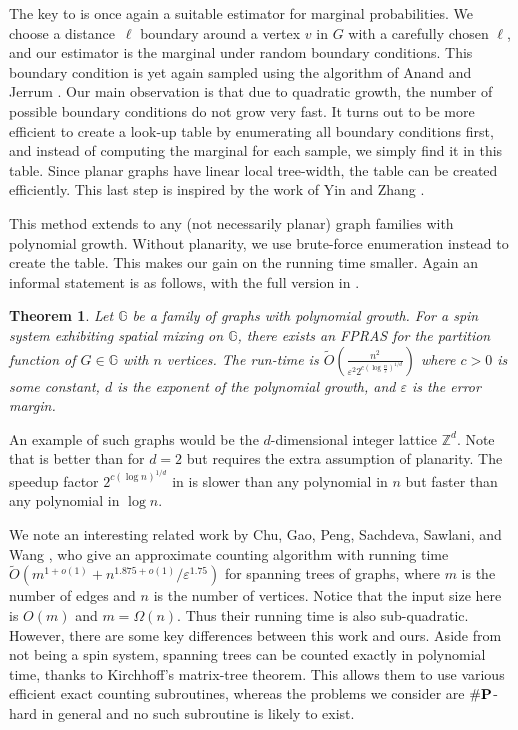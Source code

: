 \documentclass[10pt,a4paper]{article}
\newtheorem{theorem}{Theorem}[section]
\def\=#1{\mathbb{#1}}
\newcommand{\eps}{\varepsilon}
\newcommand{\numP}{\#{\textnormal{\textbf{P}}}}
\begin{document}
The key to  is once again a suitable estimator for marginal probabilities.
We choose a distance~$\ell$ boundary around a vertex $v$ in $G$ with a carefully chosen $\ell$,
and our estimator is the marginal under random boundary conditions.
This boundary condition is yet again sampled using the algorithm of Anand and Jerrum \cite{AJ22}.
Our main observation is that due to quadratic growth, 
the number of possible boundary conditions do not grow very fast.
It turns out to be more efficient to create a look-up table by enumerating all boundary conditions first,
and instead of computing the marginal for each sample,
we simply find it in this table.
Since planar graphs have linear local tree-width,
the table can be created efficiently.
This last step is inspired by the work of Yin and Zhang \cite{YZ13}.

This method extends to any (not necessarily planar) graph families with polynomial growth.
Without planarity, we use brute-force enumeration instead to create the table.
This makes our gain on the running time smaller.
Again an informal statement is as follows, with the full version in .

\begin{theorem} \label{thm:main3}
  Let $\=G$ be a family of graphs with polynomial growth.
  For a spin system exhibiting spatial mixing on $\=G$,
  there exists an FPRAS for the partition function of $G\in\=G$ with $n$ vertices.
  The run-time is $\widetilde{O}\left(\frac{n^2}{\eps^2 2^{c(\log \frac{n}{\eps})^{1/d}}}\right)$ where $c>0$ is some constant, $d$ is the exponent of the polynomial growth,
  and $\eps$ is the error margin.
\end{theorem}

An example of such graphs would be the $d$-dimensional integer lattice $\=Z^d$.
Note that  is better than  for $d=2$ but requires the extra assumption of planarity.
The speedup factor $2^{c(\log n)^{1/d}}$ in  is slower than any polynomial in $n$ but faster than any polynomial in $\log n$.

We note an interesting related work by Chu, Gao, Peng, Sachdeva, Sawlani, and Wang \cite{CGPSSW18},
who give an approximate counting algorithm with running time $\widetilde{O}(m^{1+o(1)}+n^{1.875+o(1)}/\eps^{1.75})$ for spanning trees of graphs,
where $m$ is the number of edges and $n$ is the number of vertices. Notice that the input size here is $O(m)$ and $m=\Omega(n)$.
Thus their running time is also sub-quadratic.
However, there are some key differences between this work and ours.
Aside from not being a spin system, spanning trees can be counted exactly in polynomial time, 
thanks to Kirchhoff's matrix-tree theorem.
This allows them to use various efficient exact counting subroutines,
whereas the problems we consider are $\numP$-hard in general and no such subroutine is likely to exist.
\end{document}
